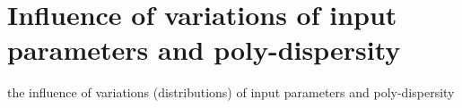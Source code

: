 
\chapter{Influence of variations of input parameters and poly-dispersity}
\label{cap:influence}

the influence of variations (distributions) of input parameters and poly-dispersity \\

\lipsum[1]

